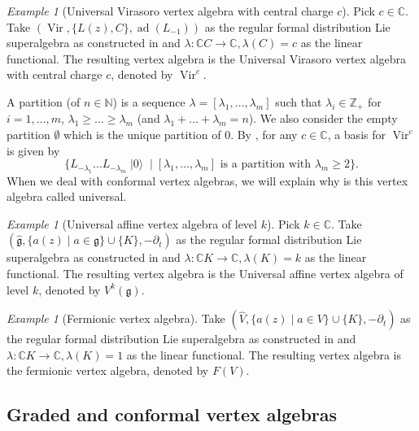 \documentclass[a4paper, 12pt, reqno]{amsart}
\theoremstyle{remark}
\newtheorem{example}[theorem]{Example}
\numberwithin{equation}{subsection}
\DeclareMathOperator{\Vir}{Vir}
\DeclareMathOperator{\vac}{|0\rangle}
\DeclareMathOperator{\ad}{ad}
\begin{document}
\begin{example}[Universal Virasoro vertex algebra with central charge $c$]
  \label{exa:5}
  Pick $c \in \mathbb{C}$.
  Take $(\Vir, \{L(z), C\}, \ad(L_{-1}))$ as the regular formal distribution Lie superalgebra as constructed in  and $\lambda: \mathbb{C}C \to \mathbb{C}, \lambda(C) = c$ as the linear functional.
  The resulting vertex algebra is the Universal Virasoro vertex algebra with central charge $c$, denoted by $\Vir^c$.

  A partition (of $n \in \mathbb{N}$) is a sequence $\lambda = [\lambda_1, \dots, \lambda_m]$ such that $\lambda_i \in \mathbb{Z}_+$ for $i = 1, \dots, m$, $\lambda_1 \ge \dots \ge \lambda_m$ (and $\lambda_1 + \dots + \lambda_m = n$).
  We also consider the empty partition $\emptyset$ which is the unique partition of $0$.
  By , for any $c \in \mathbb{C}$, a basis for $\Vir^c$ is given by
  \begin{equation*}
    \{L_{-\lambda_1}\dots L_{-\lambda_m}\vac \mid [\lambda_1, \dots, \lambda_m]\text{ is a partition with } \lambda_m \ge 2\}.
  \end{equation*}
  When we deal with conformal vertex algebras, we will explain why is this vertex algebra called universal.
\end{example}

\begin{example}[Universal affine vertex algebra of level $k$]
  \label{exa:6}
  Pick $k \in \mathbb{C}$.
  Take $(\hat{\mathfrak{g}}, \{a(z) \mid a \in \mathfrak{g}\} \cup \{K\}, -\partial_t)$ as the regular formal distribution Lie superalgebra as constructed in  and $\lambda: \mathbb{C}K \to \mathbb{C}, \lambda(K) = k$ as the linear functional.
  The resulting vertex algebra is the Universal affine vertex algebra of level $k$, denoted by $V^k(\mathfrak{g})$.
\end{example}

\begin{example}[Fermionic vertex algebra]
  \label{exa:7}
  Take $(\widehat{V}, \{a(z) \mid a \in V\} \cup \{K\}, -\partial_t)$ as the regular formal distribution Lie superalgebra as constructed in  and $\lambda: \mathbb{C}K \to \mathbb{C}, \lambda(K) = 1$ as the linear functional.
  The resulting vertex algebra is the fermionic vertex algebra, denoted by $F(V)$.
\end{example}

\subsection{Graded and conformal vertex algebras}
\label{sec:grad-conf-vert}
\end{document}
